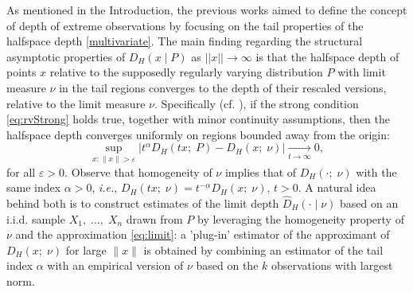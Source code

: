 \documentclass{article}
\numberwithin{equation}{section}
\renewcommand{\P}{\mathbb{P}}
\newcommand\ie{\emph{i.e.}\xspace}
\newcommand{\PP}{\P}%
\newcommand{\HS}[2]{H_{\langle{#1},{#2} \rangle, {#2}}}
\newcommand{\tto}{\xrightarrow[t\to\infty]{}}
\begin{document}
As mentioned in the Introduction, the previous works
\cite{einmahl2015bridging,he2017estimation} aimed to define the
concept of depth of extreme observations by focusing on the tail
properties of the
halfspace depth \eqref{multivariate}.
The main finding
regarding the structural
asymptotic properties of $D_H(x\mid P)$ as $\vert\vert x\vert\vert
\to \infty$ is that  the halfspace depth of points $x$ relative to
the supposedly regularly varying distribution $P$ with limit measure $\nu$ in
the tail regions converges to the depth of their rescaled versions,
relative to the limit measure $\nu$. Specifically (cf.
\cite[Proposition 2]{he2017estimation}), if the strong condition
\eqref{eq:rvStrong} holds
true, together with minor continuity assumptions, then the halfspace
depth converges uniformly on regions bounded away from the origin:
\begin{equation}\label{eq:limit}
    \sup_{x: \|x\|>\varepsilon}|t^{\alpha}D_H(tx;\; P) - D_H(x;\;
    \nu)|\tto 0,
\end{equation}
for all $\varepsilon>0$.   Observe that homogeneity of $\nu$ implies
that of $D_H(\cdot ;\; \nu)$ with the same index $\alpha>0$,
\ie, $D_H(tx;\; \nu) = t^{-\alpha} D_H(x;\; \nu)$, $t>0$.
A  natural idea behind both
\cite{einmahl2015bridging,he2017estimation} is to construct estimates
of the limit depth  $\widehat D_H(\cdot \mid  \nu)$ based on an
i.i.d. sample $X_1,\; \ldots,\; X_n$ drawn from $P$ by leveraging the
homogeneity property of $\nu$ and the approximation \eqref{eq:limit}:
a 'plug-in' estimator of the approximant of $D_H(x;\; \nu)$ for
large $\|x\|$ is obtained by combining an estimator of the tail index
$\alpha$ with an empirical version of $\nu$ based on the $k$
observations with largest norm.
\end{document}
